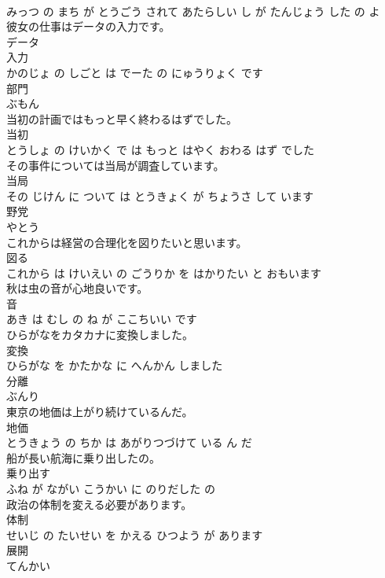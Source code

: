 \documentclass[8pt]{extreport}
\begin{document}
\begin{CJK}{UTF8}{min}
\\	みっつ の まち が とうごう されて あたらしい し が たんじょう した の よ			
\\	彼女の仕事はデータの入力です。	
\\	データ 
\\	入力 
\\	かのじょ の しごと は でーた の にゅうりょく です			
\\	部門	
\\	ぶもん		
\\	当初の計画ではもっと早く終わるはずでした。	
\\	当初 
\\	とうしょ の けいかく で は もっと はやく おわる はず でした			
\\	その事件については当局が調査しています。	
\\	当局 
\\	その じけん に ついて は とうきょく が ちょうさ して います			
\\	野党	
\\	やとう		
\\	これからは経営の合理化を図りたいと思います。	
\\	図る 
\\	これから は けいえい の ごうりか を はかりたい と おもいます			
\\	秋は虫の音が心地良いです。	
\\	音 
\\	あき は むし の ね が ここちいい です			
\\	ひらがなをカタカナに変換しました。	
\\	変換 
\\	ひらがな を かたかな に へんかん しました			
\\	分離	
\\	ぶんり		
\\	東京の地価は上がり続けているんだ。	
\\	地価 
\\	とうきょう の ちか は あがりつづけて いる ん だ			
\\	船が長い航海に乗り出したの。	
\\	乗り出す 
\\	ふね が ながい こうかい に のりだした の			
\\	政治の体制を変える必要があります。	
\\	体制 
\\	せいじ の たいせい を かえる ひつよう が あります			
\\	展開	
\\	てんかい		

\end{CJK}
\end{document}
